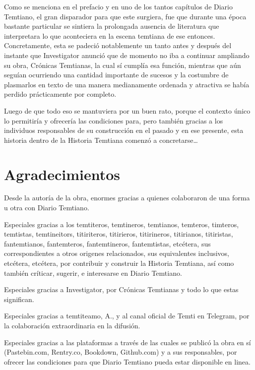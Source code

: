 \documentclass[
]{book}
\begin{document}
Como se menciona en el prefacio y en uno de los tantos capítulos de Diario Temtiano, el gran disparador para que este surgiera, fue que durante una época bastante particular se sintiera la prolongada ausencia de literatura que interpretara lo que aconteciera en la escena temtiana de ese entonces. Concretamente, esta se padeció notablemente un tanto antes y después del instante que Investigator anunció que de momento no iba a continuar ampliando su obra, Crónicas Temtianas, la cual sí cumplía esa función, mientras que aún seguían ocurriendo una cantidad importante de sucesos y la costumbre de plasmarlos en texto de una manera medianamente ordenada y atractiva se había perdido prácticamente por completo.

Luego de que todo eso se mantuviera por un buen rato, porque el contexto único lo permitiría y ofrecería las condiciones para, pero también gracias a los individuos responsables de su construcción en el pasado y en ese presente, esta historia dentro de la Historia Temtiana comenzó a concretarse\ldots{}

\hypertarget{agradecimientos}{%
\section*{Agradecimientos}\label{agradecimientos}}

Desde la autoría de la obra, enormes gracias a quienes colaboraron de una forma u otra con Diario Temtiano.

Especiales gracias a los temtiteros, temtineros, temtianos, temteros, timteros, temtistas, temtineitors, titiriteros, titirieros, titirineros, titirianos, titiristas, fantemtianos, fantemteros, fantemtineros, fantemtistas, etcétera, sus correspondientes a otros origenes relacionados, sus equivalentes inclusivos, etcétera, etcétera, por contribuir y construir la Historia Temtiana, así como también críticar, sugerir, e interesarse en Diario Temtiano.

Especiales gracias a Investigator, por Crónicas Temtianas y todo lo que estas significan.

Especiales gracias a temtiteamo, A., y al canal oficial de Temti en Telegram, por la colaboración extraordinaria en la difusión.

Especiales gracias a las plataformas a través de las cuales se publicó la obra en sí (Pastebin.com, Rentry.co, Bookdown, Github.com) y a sus responsables, por ofrecer las condiciones para que Diario Temtiano pueda estar disponible en linea.
\end{document}
